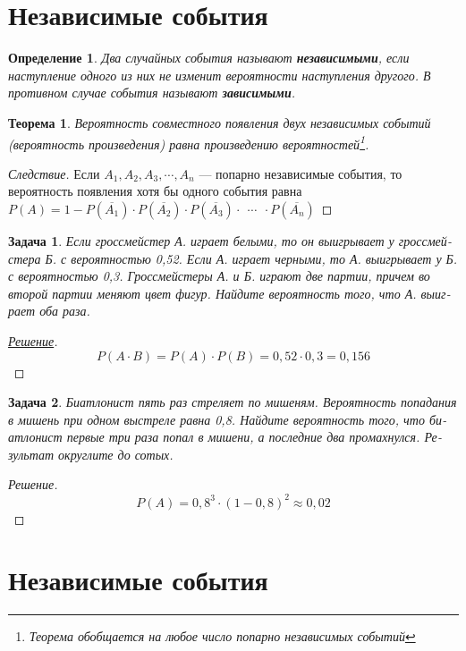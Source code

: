 \documentclass[a4paper,12pt]{article}
\newtheorem{define}{Определение}
\newtheorem{theorem}{Теорема}
\newtheorem{problem}{Задача}
\begin{document}
\section{Независимые события}

\begin{define}
Два случайных события называют \textbf{независимыми}, если наступление одного из них не изменит вероятности наступления другого. В противном случае события называют \textbf{зависимыми}.
\end{define}

\begin{theorem}
Вероятность совместного появления двух независимых событий (вероятность произведения) равна произведению вероятностей\footnote{Теорема обобщается на любое число попарно независимых событий}.
\end{theorem}
\begin{proof}[Следствие]
Если $A_1, A_2, A_3, \cdots, A_n$ --- попарно независимые события, то вероятность появления хотя бы одного события равна $P(A)=1-P(\overline{A_1})\cdot{}P(\overline{A_2})\cdot{}P(\overline{A_3})\cdot\ \ \cdots\ \ \cdot{}P(\overline{A_n})$
\end{proof}

\begin{problem}
	Если гросс­мей­стер А. иг­ра­ет бе­лы­ми, то он вы­иг­ры­ва­ет у гросс­мей­сте­ра Б. с ве­ро­ят­но­стью 0,52. Если А. иг­ра­ет чер­ны­ми, то А. вы­иг­ры­ва­ет у Б. с ве­ро­ят­но­стью 0,3. Гросс­мей­сте­ры А. и Б. иг­ра­ют две пар­тии, при­чем во вто­рой пар­тии ме­ня­ют цвет фигур. Най­ди­те ве­ро­ят­ность того, что А. вы­иг­ра­ет оба раза.
\end{problem}
\begin{proof}[\href{http://math.reshuege.ru/test?pid=319555}{Решение}]
	$$P(A\cdot{}B)=P(A)\cdot{}P(B)=0,52\cdot{}0,3=0,156$$
\end{proof}

\begin{problem}
Би­ат­ло­нист пять раз стре­ля­ет по ми­ше­ням. Ве­ро­ят­ность по­па­да­ния в ми­шень при одном вы­стре­ле равна 0,8. Най­ди­те ве­ро­ят­ность того, что би­ат­ло­нист пер­вые три раза попал в ми­ше­ни, а по­след­ние два про­мах­нул­ся. Ре­зуль­тат округ­ли­те до сотых.
\end{problem}
\begin{proof}[{Решение}]
	$$P(A)={0,8}^3\cdot{(1-0,8)}^2\approx0,02$$
\end{proof}

\section{Независимые события}
\end{document}
